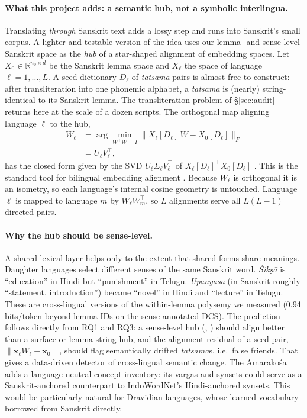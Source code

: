 \paragraph{What this project adds: a semantic hub, not a symbolic
interlingua.} Translating \emph{through} Sanskrit text adds a lossy step
and runs into Sanskrit's small corpus. A lighter and testable version of the
idea uses our lemma- and sense-level Sanskrit space as the \emph{hub} of a
star-shaped alignment of embedding spaces. Let $X_0\in\mathbb{R}^{n_0\times
d}$ be the Sanskrit lemma space and $X_\ell$ the space of language
$\ell=1,\dots,L$. A seed dictionary $D_\ell$ of \emph{tatsama} pairs is
almost free to construct: after transliteration into one phonemic alphabet,
a \emph{tatsama} is (nearly) string-identical to its Sanskrit lemma. The
transliteration problem of \S\ref{sec:audit} returns here at the scale of
a dozen scripts. The orthogonal map aligning language $\ell$ to the hub,
\begin{align*}
W_\ell&=\arg\min_{W^\top W=I}\big\|X_\ell[D_\ell]\,W-X_0[D_\ell]\big\|_F\\
&=U_\ell V_\ell^\top,
\end{align*}
has the closed form given by the SVD $U_\ell\Sigma_\ell V_\ell^\top$ of
$X_\ell[D_\ell]^\top X_0[D_\ell]$ \citep{schonemann1966generalized}. This is
the standard tool for bilingual embedding alignment
\citep{mikolov2013exploiting,smith2017offline,conneau2018word}. Because
$W_\ell$ is orthogonal it is an isometry, so each language's internal
cosine geometry is untouched. Language $\ell$ is mapped to language $m$ by
$W_\ell W_m^\top$, so $L$ alignments serve all $L(L-1)$ directed pairs.

\paragraph{Why the hub should be sense-level.} A shared lexical layer helps
only to the extent that shared forms share meanings. Daughter languages
select different senses of the same Sanskrit word. \emph{Śikṣā} is
``education'' in Hindi but ``punishment'' in Telugu. \emph{Upanyāsa} (in
Sanskrit roughly ``statement, introduction'') became ``novel'' in Hindi and
``lecture'' in Telugu. These are cross-lingual versions of the within-lemma
polysemy we measured (0.94 bits/token beyond lemma IDs on the sense-annotated
DCS). The prediction follows directly from RQ1 and RQ3: a sense-level hub
(, ) should align better than a surface or lemma-string
hub, and the alignment residual of a seed pair,
$\|\mathbf{x}_\ell W_\ell-\mathbf{x}_0\|$, should flag semantically drifted
\emph{tatsama}s, i.e.\ false friends. That gives a data-driven detector of
cross-lingual semantic change. The Amarakośa adds a language-neutral concept
inventory: its vargas and synsets could serve as a Sanskrit-anchored
counterpart to IndoWordNet's Hindi-anchored synsets. This would be
particularly natural for Dravidian languages, whose learned vocabulary
borrowed from Sanskrit directly.


